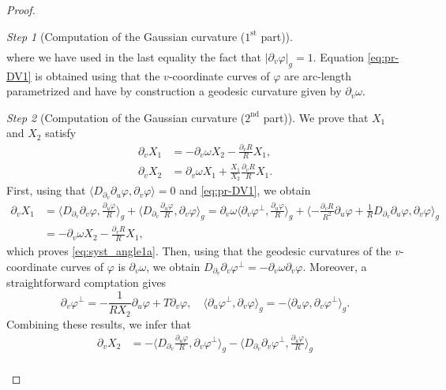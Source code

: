 \documentclass{article}
\newcommand{\DV}{\partial_{v}}
\theoremstyle{remark}
\theoremstyle{prpart}
\newtheorem{proofpart}{Step}
\newcommand{\PU}{\partial_{u}\varphi}
\newcommand{\PV}{\partial_{v}\varphi}
\newcommand{\NPU}{{\textstyle\frac{\partial_{u}\varphi}{R}}}
\begin{document}
\begin{proof}
\begin{proofpart}[Computation of the Gaussian curvature ($1^{\text{st}}$ part)]
\begin{align*}
\end{align*}
where we have used in the last equality the fact that $|\PV|_g=1$. Equation \eqref{eq:pr-DV1} is obtained using that the $v$-coordinate curves of $\varphi$ are arc-length parametrized and have by construction a geodesic curvature given by $\DV\omega$.
\end{proofpart}
\begin{proofpart}[Computation of the Gaussian curvature ($2^{\text{nd}}$ part)]\label{step:gauss-curv2}
We prove that $X_1$ and $X_2$ satisfy
\begin{subequations}\label{eq:syst_angle1}
\begin{align}\label{eq:syst_angle1a}
\DV X_{1}&=-\DV\omega X_2 - \frac{\DV R}{R} X_1,\\
\DV X_{2} &=\DV\omega X_1 + \frac{X_1}{X_2} \frac{\DV R}{R}X_1.\label{eq:syst_angle1b}
\end{align}
\end{subequations}
First, using that $\langle D_{\partial_v}\PU,\PV\rangle = 0$ and \eqref{eq:pr-DV1}, we obtain 
\begin{align*}
  \partial_v X_1& = \big\langle D_{\partial_v}\PV,\NPU\big\rangle_g + \big\langle D_{\partial_v}\NPU,\PV\big\rangle_g  = \DV\omega \big\langle \PV^\perp,\NPU\big\rangle_g+ \langle-\frac{\DV R}{R^2}\PU+\frac{1}{R}D_{\partial_v}\PU,\PV\rangle_g\\
  &=  -\DV\omega X_2 - \frac{\DV R}{R} X_1,
\end{align*}
which proves \eqref{eq:syst_angle1a}.
Then, using that the geodesic curvatures of the $v$-coordinate curves of $\varphi$ is $\DV \omega$, we obtain $D_{\DV}\PV^\perp=-\DV\omega\PV$. Moreover, a straightforward comptation gives
\begin{equation*}
  \PV^\perp = -\frac{1}{RX_2}\PU+T\PV,\quad\big\langle\PU^\perp,\PV\big\rangle_g=-\big\langle\PU,\PV^\perp\big\rangle_g.
\end{equation*}
Combining these results, we infer that
\begin{align*}
    \partial_v X_2 &= -\big\langle D_{\partial_v}\NPU,\PV^\perp\big\rangle_g - \big\langle D_{\partial_v}\PV^\perp,\NPU\big\rangle_g \\

\end{align*}
\end{proofpart}
\end{proof}
\end{document}
